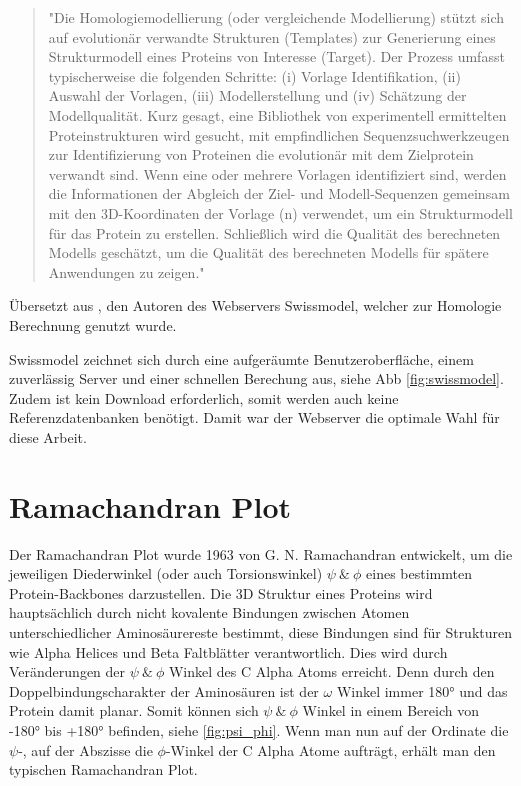 \begin{quote}
    "Die Homologiemodellierung (oder vergleichende Modellierung) stützt sich auf evolutionär verwandte Strukturen (Templates) zur Generierung eines Strukturmodell eines Proteins von Interesse (Target). Der Prozess umfasst typischerweise die folgenden Schritte: (i) Vorlage Identifikation, (ii) Auswahl der Vorlagen, (iii) Modellerstellung und (iv) Schätzung der Modellqualität. Kurz gesagt, eine Bibliothek von experimentell ermittelten Proteinstrukturen wird gesucht, mit empfindlichen Sequenzsuchwerkzeugen zur Identifizierung von Proteinen die evolutionär mit dem Zielprotein verwandt sind. Wenn eine oder mehrere Vorlagen identifiziert sind, werden die Informationen der Abgleich der Ziel- und Modell-Sequenzen gemeinsam mit den 3D-Koordinaten der Vorlage (n) verwendet, um ein Strukturmodell für das Protein zu erstellen. Schließlich wird die Qualität des berechneten Modells geschätzt, um die Qualität des berechneten Modells für spätere Anwendungen zu zeigen."
\end{quote}

Übersetzt aus \cite{Biasini.2014}, den Autoren des Webservers Swissmodel, welcher zur Homologie Berechnung genutzt wurde. 

Swissmodel zeichnet sich durch eine aufgeräumte Benutzeroberfläche, einem zuverlässig Server und einer schnellen Berechung aus, siehe \ac{Abb} \ref{fig:swissmodel}. Zudem ist kein Download erforderlich, somit werden auch keine Referenzdatenbanken benötigt. Damit war der Webserver die optimale Wahl für diese Arbeit.



\section{Ramachandran Plot}
\label{sec:ramachandran}
Der Ramachandran Plot wurde 1963 von G. N. Ramachandran \cite{RAMACHANDRAN.1963} entwickelt, um die jeweiligen Diederwinkel (oder auch Torsionswinkel)  $\psi\ \&\ \phi$ eines bestimmten Protein-Backbones darzustellen. Die 3D Struktur eines Proteins wird hauptsächlich durch nicht kovalente Bindungen zwischen Atomen unterschiedlicher Aminosäurereste bestimmt, diese Bindungen sind für Strukturen wie Alpha Helices und Beta Faltblätter verantwortlich. Dies wird durch Veränderungen der  $\psi\ \&\ \phi$ Winkel des C Alpha Atoms erreicht. Denn durch den Doppelbindungscharakter der Aminosäuren ist der $\omega$ Winkel immer 180° und das Protein damit planar. Somit können sich $\psi\ \&\ \phi$ Winkel in einem Bereich von -180° bis +180° befinden, siehe \ref{fig:psi_phi}. Wenn man nun auf der Ordinate die $\psi$-, auf der Abszisse die $\phi$-Winkel der C Alpha Atome aufträgt, erhält man den typischen Ramachandran Plot. 

